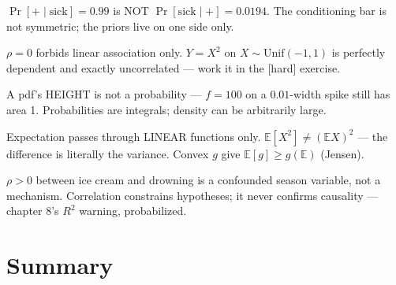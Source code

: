 \begin{tripwire}
$\Pr[+\mid\text{sick}]=0.99$ is NOT $\Pr[\text{sick}\mid+]=0.0194$. The
conditioning bar is not symmetric; the priors live on one side only.
\end{tripwire}

\begin{tripwire}
$\rho=0$ forbids linear association only. $Y=X^{2}$ on
$X\sim\mathrm{Unif}(-1,1)$ is perfectly dependent and exactly
uncorrelated --- work it in the [hard] exercise.
\end{tripwire}

\begin{tripwire}
A pdf's HEIGHT is not a probability --- $f=100$ on a $0.01$-width spike
still has area 1. Probabilities are integrals; density can be arbitrarily
large.
\end{tripwire}

\begin{tripwire}[{$\mathbb E[g(X)]=g(\mathbb E X)$}]
Expectation passes through LINEAR functions only.
$\mathbb E[X^{2}]\ne(\mathbb E X)^{2}$ --- the difference is literally
the variance. Convex $g$ give $\mathbb E[g]\ge g(\mathbb E)$ (Jensen).
\end{tripwire}

\begin{tripwire}
$\rho>0$ between ice cream and drowning is a confounded season variable,
not a mechanism. Correlation constrains hypotheses; it never confirms
causality --- chapter 8's $R^{2}$ warning, probabilized.
\end{tripwire}

\section{Summary}

